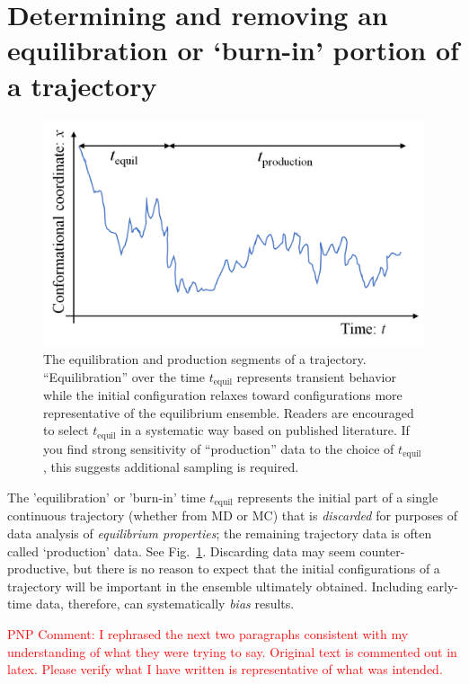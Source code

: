 
\section{Determining and removing an equilibration or `burn-in' portion of a trajectory}
\label{sec:equil}

\begin{figure}
  \centering
  \includegraphics[width=0.9\linewidth]{figures/tequil-time-trace}
  \caption{
  \label{fig:tequil}
  The equilibration and production segments of a trajectory.
  ``Equilibration'' over the time $t_{\mathrm{equil}}$ represents transient behavior while the initial configuration relaxes toward configurations more representative of the equilibrium ensemble.
  Readers are encouraged to select $t_{\mathrm{equil}}$ in a systematic way based on published literature.
  If you find strong sensitivity of ``production'' data to the choice of $t_{\mathrm{equil}}$, this suggests additional sampling is required.
  }
\end{figure}

The 'equilibration' or 'burn-in' time $t_{\mathrm{equil}}$ represents the initial part of a single continuous trajectory (whether from MD or MC) that is \emph{discarded} for purposes of data analysis of \emph{equilibrium properties};
the remaining trajectory data is often called `production' data.
See Fig.\ \ref{fig:tequil}.
Discarding data may seem counter-productive, but there is no reason to expect that the initial configurations of a trajectory will be important in the ensemble ultimately obtained.
Including early-time data, therefore, can systematically \emph{bias} results.

\textcolor{red}{PNP Comment: I rephrased the next two paragraphs consistent with my understanding of what they were trying to say. Original text is commented out in latex.  Please verify what I have written is representative of what was intended.}

